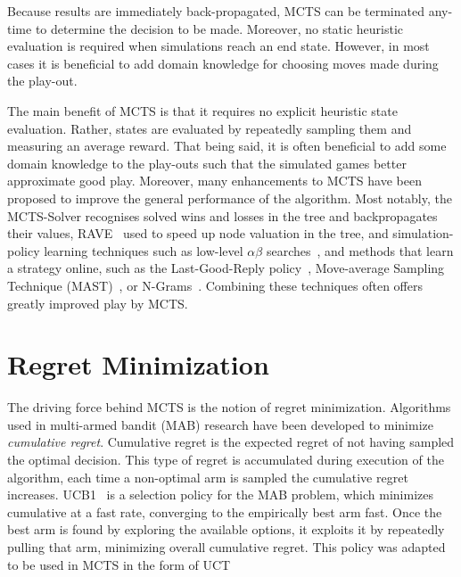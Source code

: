 \documentclass{kecsmstr}
\begin{document}
Because results are immediately back-propagated, MCTS can be terminated any-time to determine the decision to be made. Moreover, no static heuristic evaluation is required when simulations reach an end state. However, in most cases it is beneficial to add domain knowledge for choosing moves made during the play-out.

The main benefit of MCTS is that it requires no explicit heuristic state evaluation. Rather, states are evaluated by repeatedly sampling them and measuring an average reward. That being said, it is often beneficial to add some domain knowledge to the play-outs such that the simulated games better approximate good play. Moreover, many enhancements to MCTS have been proposed to improve the general performance of the algorithm. Most notably, the MCTS-Solver  recognises solved wins and losses in the tree and backpropagates their values, RAVE~ used to speed up node valuation in the tree, and simulation-policy learning techniques such as low-level $\alpha\beta$ searches~, and methods that learn a strategy online, such as the Last-Good-Reply policy~, Move-average Sampling Technique (MAST)~, or N-Grams~. Combining these techniques often offers greatly improved play by MCTS.

\section{Regret Minimization}
The driving force behind MCTS is the notion of regret minimization. Algorithms used in multi-armed bandit (MAB) research have been developed to minimize \emph{cumulative regret}. Cumulative regret is the expected regret of not having sampled the optimal decision. This type of regret is accumulated during execution of the algorithm, each time a non-optimal arm is sampled the cumulative regret increases. UCB1~ is a selection policy for the MAB problem, which minimizes cumulative at a fast rate, converging to the empirically best arm fast. Once the best arm is found by exploring the available options, it exploits it by repeatedly pulling that arm, minimizing overall cumulative regret. This policy was adapted to be used in MCTS in the form of UCT~
\end{document}
